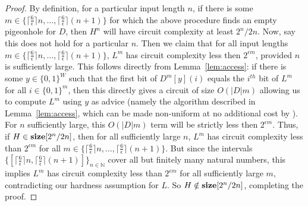 \documentclass[11pt]{article}
\newcommand{\B}{\{0,1\}}
\def\cl{\bf}
\begin{document}
\begin{proof}
By definition, for a particular input length $n$, if there is some $m \in \{\lceil \frac{6}{\epsilon} \rceil n, \ldots, \lceil \frac{6}{\epsilon} \rceil (n+1)\}$ for which the above procedure finds an empty pigeonhole for $D$, then $H^n$ will have circuit complexity at least $2^n/2n$. Now, say this does not hold for a particular $n$. Then we claim that for all input lengths $m \in \{\lceil \frac{6}{\epsilon} \rceil n, \ldots, \lceil \frac{6}{\epsilon} \rceil (n+1)\}$, $L^m$ has circuit complexity less then $2^{\epsilon m}$, provided $n$ is sufficiently large. This follows directly from Lemma~\ref{lem:access}: if there is some $y \in \B^W$ such that the first bit of $D^m[y](i)$ equals the $i^{th}$ bit of $L^m$ for all $i \in \B^m$, then this directly gives a circuit of size $O(|D|m)$ allowing us to compute $L^m$ using $y$ as advice (namely the algorithm described in Lemma~\ref{lem:access}, which can be made non-uniform at no additional cost by \cite{Korten}). For $n$ sufficiently large, this $O(|D|m)$ term  will be strictly less then $2^{\epsilon m}$. Thus, if $H \in {\cl size}[2^n/2n]$, then for all sufficiently large $n$, $L^m $ has circuit complexity less than $2^{\epsilon m}$ for all $m \in  \{\lceil \frac{6}{\epsilon} \rceil n, \ldots, \lceil \frac{6}{\epsilon} \rceil (n+1)\}$. But since the intervals $\{[\lceil \frac{6}{\epsilon} \rceil n, \lceil \frac{6}{\epsilon} \rceil (n+1)]\}_{n \in \mathbb{N}}$ cover all but finitely many natural numbers, this implies $L^m$ has circuit complexity less than $2^{\epsilon m}$ for all sufficiently large $m$, contradicting our hardness assumption for $L$. So $H \notin {\cl size}[2^n/2n]$, completing the proof.
\end{proof}
\end{document}
